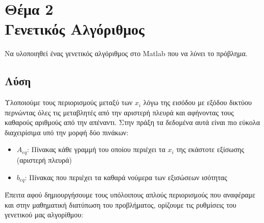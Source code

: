 \documentclass[twocolumn]{report}
\begin{document}
\section*{Θέμα 2\\Γενετικός Αλγόριθμος}
Να υλοποιηθεί ένας γενετικός αλγόριθμος στο 
Matlab που να λύνει το πρόβλημα.
\subsection*{Λύση}
Υλοποιούμε τους περιορισμούς μεταξύ των $x_i$ λόγω της εισόδου με εξόδου δικτύου 
περνώντας όλες τις μεταβλητές από την αριστερή πλευρά και αφήνοντας τους καθαρούς
αριθμούς από την απέναντι. Στην πράξη τα δεδομένα αυτά είναι πιο εύκολα διαχειρίσιμα 
υπό την μορφή δύο πινάκων:
\begin{itemize}
    \item $A_{eq}$: Πίνακας κάθε γραμμή του οποίου περιέχει τα $x_i$ της εκάστοτε 
    εξίσωσης (αριστερή πλευρά)
    \item $b_{eq}$: Πίνακας που περιέχει τα καθαρά νούμερα των εξισώσεων ισότητας
\end{itemize}
Έπειτα αφού δημιουργήσουμε τους υπόλοιπους απλούς περιορισμούς που αναφέραμε και στην 
μαθηματική διατύπωση του προβλήματος, ορίζουμε τις ρυθμίσεις του γενετικού μας αλγορίθμου:
\end{document}
